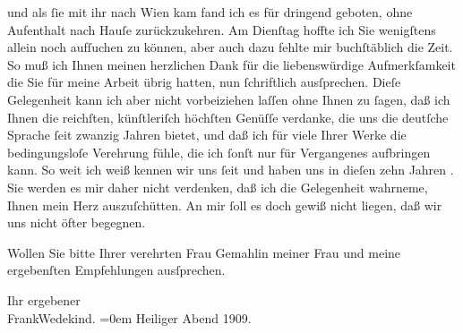                und als{ }ſie mit ihr nach Wien kam fand ich es für
               dringend geboten, ohne Aufenthalt nach Hauſe zurückzukehren. Am Dienſtag hoffte ich Sie
               wenigſtens allein noch aufſuchen zu können, aber auch dazu fehlte mir buchſtäblich
               die Zeit. So muß ich Ihnen meinen herzlichen Dank für die liebenswürdige
               Aufmerkſamkeit {\pb}die Sie für meine Arbeit
               übrig hatten, nun{ }ſchriftlich ausſprechen. Dieſe Gelegenheit kann ich aber nicht
               vorbeiziehen laſſen ohne Ihnen zu{ }ſagen, daß ich Ihnen die reichſten, künſtleriſch
               höchſten Genüſſe verdanke, die uns die deutſche Sprache{ }ſeit zwanzig Jahren bietet,
               und daß ich für viele Ihrer Werke die bedingungsloſe Verehrung fühle, die ich{ }ſonſt
               nur für Vergangenes aufbringen kann. So weit ich weiß kennen wir uns{ }ſeit \label{K_L01909-1v}\label{K_L01909-1} und haben uns in dieſen zehn Jahren {\pb}\label{K_L01909-2v}\label{K_L01909-2}. Sie werden es mir daher nicht verdenken, daß ich die Gelegenheit wahrneme,
               Ihnen mein Herz auszuſchütten. An mir{ }ſoll es doch gewiß nicht liegen, daß wir uns
               nicht öfter begegnen.\pend
           
\pstart
           Wollen Sie bitte Ihrer verehrten Frau Gemahlin meiner Frau und meine ergebenſten Empfehlungen ausſprechen.\pend
           
\pstart
           Ihr ergebener{\\[\baselineskip]}\spacefill\mbox{FrankWedekind.}\pend
           \leftskip=0em{}
\pstart
           Heiliger Abend 1909.\pend
           \endnumbering{}  \newcommand{\dateiname}{L01909}\newcommand{\titel}{Frank Wedekind an Arthur Schnitzler, 24. 12. 1909}\newcommand{\editorInnen}{Martin Anton Müller und Gerd-Hermann Susen}
